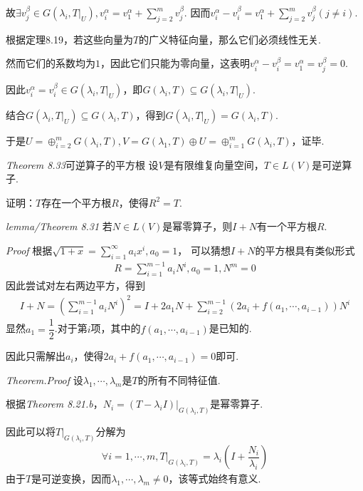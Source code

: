 故\(\exists v_j^\beta \in G(\lambda_i,T|_U),v_i^\alpha=v_1^\alpha+\sum_{j=2}^m v_j^\beta\).
因而\(v_i^\alpha-v_i^\beta=v_1^\alpha+\sum_{j=2}^m v_j^\beta(j \ne i)\).

根据定理8.19，若这些向量为\(T\)的广义特征向量，那么它们必须线性无关.

然而它们的系数均为\(1\)，因此它们只能为零向量，这表明\(v_i^\alpha-v_i^\beta=v_1^\alpha=v_j^\beta=0\).

因此\(v_i^\alpha=v_i^\beta \in G(\lambda_i,T|_U)\)，即\(G(\lambda_i,T) \subseteq G(\lambda_i,T|_U)\).

结合\(G(\lambda_i,T|_U) \subseteq G(\lambda_i,T)\)，得到\(G(\lambda_i,T|_U)=G(\lambda_i,T)\).

于是\(U=\oplus_{i=2}^m G(\lambda_i,T),V=G(\lambda_1,T) \oplus U=\oplus_{i=1}^m G(\lambda_i,T)\)，证毕.

\newpage

\textit{Theorem 8.33}{\kaishu 可逆算子的平方根}
设\(V\)是有限维复向量空间，\(T \in L(V)\)是可逆算子.

证明：\(T\)存在一个平方根\(R\)，使得\(R^2=T\).

\textit{lemma/Theorem 8.31}
若\(N \in L(V)\)是幂零算子，则\(I+N\)有一个平方根\(R\).

\textit{Proof}
根据\(\sqrt{1+x}=\sum_{i=1}^\infty a_ix^i,a_0=1\)，
可以猜想\(I+N\)的平方根具有类似形式
    \begin{align*}
        R=\sum_{i=1}^{m-1} a_iN^i,a_0=1,N^m=0
    \end{align*}
因此尝试对左右两边平方，得到
    \begin{align*}
        I+N = (\sum_{i=1}^{m-1} a_iN^i)^2 
            = I+2a_1N+\sum_{i=2}^{m-1} (2a_i+f(a_1,\cdots,a_{i-1}))N^i
    \end{align*}
显然\(a_1=\dfrac{1}{2}\).对于第\(i\)项，其中的\(f(a_1,\cdots,a_{i-1})\)是已知的.

因此只需解出\(a_i\)，使得\(2a_i+f(a_1,\cdots,a_{i-1})=0\)即可.

\textit{Theorem.Proof}
设\(\lambda_1,\cdots,\lambda_m\)是\(T\)的所有不同特征值.

根据\textit{Theorem 8.21.b}，\(N_i=(T-\lambda_i I)|_{G(\lambda_i,T)}\)是幂零算子.

因此可以将\(T|_{G(\lambda_i,T)}\)分解为
    \begin{align*}
        \forall i=1,\cdots,m,T|_{G(\lambda_i,T)}=\lambda_i(I+\dfrac{N_i}{\lambda_i})
    \end{align*}
由于\(T\)是可逆变换，因而\(\lambda_1,\cdots,\lambda_m \ne 0\)，该等式始终有意义.

